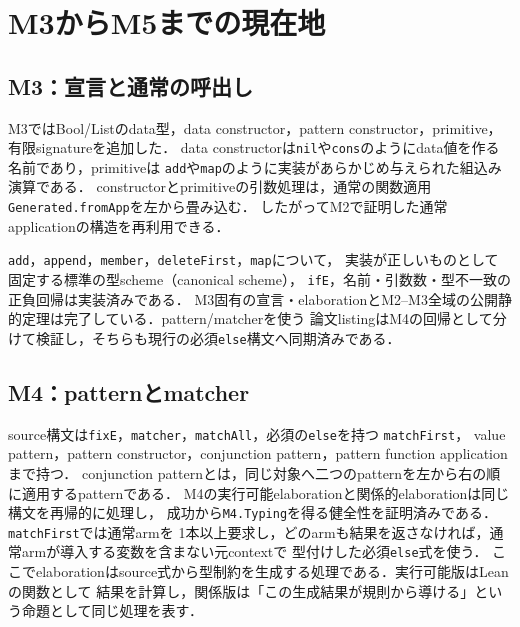 \documentclass[11pt,a4paper,oneside]{ltjsbook}
\newcommand{\code}[1]{\texttt{#1}}
\begin{document}
\chapter{M3からM5までの現在地}

\section{M3：宣言と通常の呼出し}

M3ではBool/Listのdata型，data constructor，pattern constructor，primitive，有限signatureを追加した．
data constructorは\code{nil}や\code{cons}のようにdata値を作る名前であり，primitiveは
\code{add}や\code{map}のように実装があらかじめ与えられた組込み演算である．
constructorとprimitiveの引数処理は，通常の関数適用\code{Generated.fromApp}を左から畳み込む．
したがってM2で証明した通常applicationの構造を再利用できる．

\code{add}，\code{append}，\code{member}，\code{deleteFirst}，\code{map}について，
実装が正しいものとして固定する標準の型scheme（canonical scheme），
\code{ifE}，名前・引数数・型不一致の正負回帰は実装済みである．
M3固有の宣言・elaborationとM2--M3全域の公開静的定理は完了している．pattern/matcherを使う
論文listingはM4の回帰として分けて検証し，そちらも現行の必須\code{else}構文へ同期済みである．

\section{M4：patternとmatcher}

source構文は\code{fixE}，\code{matcher}，\code{matchAll}，必須の\code{else}を持つ
\code{matchFirst}，
value pattern，pattern constructor，conjunction pattern，pattern function applicationまで持つ．
conjunction patternとは，同じ対象へ二つのpatternを左から右の順に適用するpatternである．
M4の実行可能elaborationと関係的elaborationは同じ構文を再帰的に処理し，
成功から\code{M4.Typing}を得る健全性を証明済みである．\code{matchFirst}では通常armを
1本以上要求し，どのarmも結果を返さなければ，通常armが導入する変数を含まない元contextで
型付けした必須\code{else}式を使う．
ここでelaborationはsource式から型制約を生成する処理である．実行可能版はLeanの関数として
結果を計算し，関係版は「この生成結果が規則から導ける」という命題として同じ処理を表す．
\end{document}
